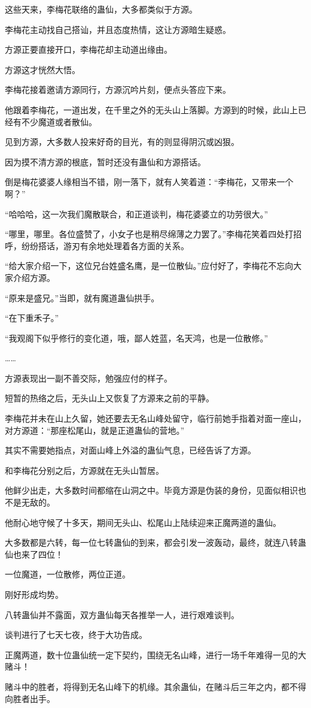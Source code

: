 \begin{this_body}
这些天来，李梅花联络的蛊仙，大多都类似于方源。

李梅花主动找自己搭讪，并且态度热情，这让方源暗生疑惑。

方源正要直接开口，李梅花却主动道出缘由。

方源这才恍然大悟。

李梅花接着邀请方源同行，方源沉吟片刻，便点头答应下来。

他跟着李梅花，一道出发，在千里之外的无头山上落脚。方源到的时候，此山上已经有不少魔道或者散仙。

见到方源，大多数人投来好奇的目光，有的则显得阴沉或凶狠。

因为摸不清方源的根底，暂时还没有蛊仙和方源搭话。

倒是梅花婆婆人缘相当不错，刚一落下，就有人笑着道：“李梅花，又带来一个啊？”

“哈哈哈，这一次我们魔散联合，和正道谈判，梅花婆婆立的功劳很大。”

“哪里，哪里。各位盛赞了，小女子也是稍尽绵薄之力罢了。”李梅花笑着四处打招呼，纷纷搭话，游刃有余地处理着各方面的关系。

“给大家介绍一下，这位兄台姓盛名鹰，是一位散仙。”应付好了，李梅花不忘向大家介绍方源。

“原来是盛兄。”当即，就有魔道蛊仙拱手。

“在下重禾子。”

“我观阁下似乎修行的变化道，哦，鄙人姓蓝，名天鸿，也是一位散修。”

……

方源表现出一副不善交际，勉强应付的样子。

短暂的热络之后，无头山上又恢复了方源来之前的平静。

李梅花并未在山上久留，她还要去无名山峰处留守，临行前她手指着对面一座山，对方源道：“那座松尾山，就是正道蛊仙的营地。”

其实不需要她指点，对面山峰上外溢的蛊仙气息，已经告诉了方源。

和李梅花分别之后，方源就在无头山暂居。

他鲜少出走，大多数时间都缩在山洞之中。毕竟方源是伪装的身份，见面似相识也不是无敌的。

他耐心地守候了十多天，期间无头山、松尾山上陆续迎来正魔两道的蛊仙。

大多数都是六转，每一位七转蛊仙的到来，都会引发一波轰动，最终，就连八转蛊仙也来了四位！

一位魔道，一位散修，两位正道。

刚好形成均势。

八转蛊仙并不露面，双方蛊仙每天各推举一人，进行艰难谈判。

谈判进行了七天七夜，终于大功告成。

正魔两道，数十位蛊仙统一定下契约，围绕无名山峰，进行一场千年难得一见的大赌斗！

赌斗中的胜者，将得到无名山峰下的机缘。其余蛊仙，在赌斗后三年之内，都不得向胜者出手。

\end{this_body}

